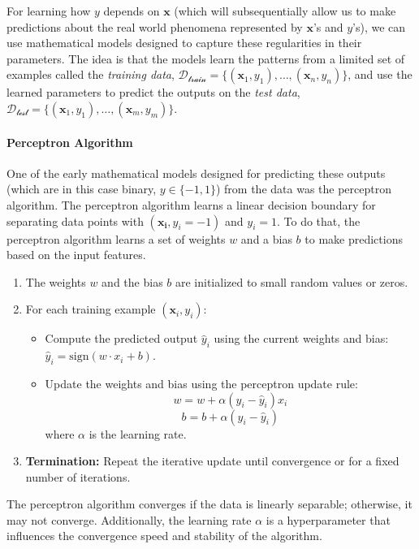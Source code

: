 For learning how $y$ depends on $\mathbf{x}$ (which will subsequentially allow us to make predictions about the real world phenomena represented by $\mathbf{x}$'s and $y$'s), we can use mathematical models designed to capture these regularities in their parameters. The idea is that the models learn the patterns from a limited set of examples called the \textit{training data},  $\mathcal{D_{\text{train}}} = \{(\mathbf{x}_1, y_1), \ldots, (\mathbf{x}_{n}, y_{n})\}$, and use the learned parameters to predict the outputs on the \textit{test data}, $\mathcal{D_{\text{test}}} = \{(\mathbf{x}_1, y_1), \ldots, (\mathbf{x}_{m}, y_{m})\}$.

\paragraph{Perceptron Algorithm} One of the early mathematical models designed for predicting these outputs (which are in this case binary, $y \in \{-1, 1\}$) from the data was the perceptron algorithm. The perceptron algorithm learns a linear decision boundary for separating data points with $(\mathbf{x_i}, y_i = -1)$ and $y_i = 1$. To do that, the perceptron algorithm learns a set of weights $w$ and a bias $b$ to make predictions based on the input features.




\begin{enumerate}
    \item The weights $w$ and the bias $b$ are initialized to small random values or zeros.
    \item For each training example $(\mathbf{x}_i, y_i)$:
          \begin{itemize}
              \item Compute the predicted output $\hat{y}_i$ using the current weights and bias: $\hat{y}_i = \text{sign}(w \cdot x_i + b)$.
              \item Update the weights and bias using the perceptron update rule:
                    \[ w = w + \alpha (y_i - \hat{y}_i) x_i \]
                    \[ b = b + \alpha (y_i - \hat{y}_i) \]
                    where $\alpha$ is the learning rate.
          \end{itemize}
    \item \textbf{Termination:} Repeat the iterative update until convergence or for a fixed number of iterations.
\end{enumerate}

The perceptron algorithm converges if the data is linearly separable; otherwise, it may not converge. Additionally, the learning rate $\alpha$ is a hyperparameter that influences the convergence speed and stability of the algorithm.




